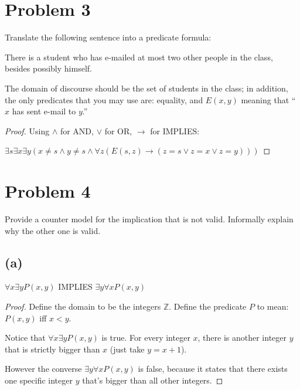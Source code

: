 \documentclass[14pt]{extarticle}
\begin{document}
\section{Problem 3}
Translate the following sentence into a predicate formula:

There is a student who has e-mailed at most two other people in the class, besides possibly himself.

The domain of discourse should be the set of students in the class; in addition, the only predicates that you may use are: equality, and $E(x, y)$ meaning that “$x$ has sent e-mail to $y$.”
\begin{proof}
Using $\wedge$ for AND, $\vee$ for OR, $\rightarrow$ for IMPLIES:

$\exists s \exists x \exists y (x \neq s \wedge y \neq s \wedge \forall z(E(s, z) \rightarrow (z = s \vee z = x \vee z = y)))$
\end{proof}

\section{Problem 4}
Provide a counter model for the implication that is not valid. Informally explain why the other one is valid.

\subsection{(a)}
$\forall x \exists y P(x, y)$ IMPLIES $\exists y \forall x P(x, y)$
\begin{proof}
Define the domain to be the integers $\mathbb{Z}$. Define the predicate $P$ to mean: $P(x, y)$ iff $x < y$.

Notice that $\forall x \exists y P(x, y)$ is true. For every integer $x$, there is another integer $y$ that is strictly bigger than $x$ (just take $y = x+1$).

However the converse $\exists y \forall x P(x, y)$ is false, because it states that there exists one specific integer $y$ that's bigger than all other integers.
\end{proof}
\end{document}
